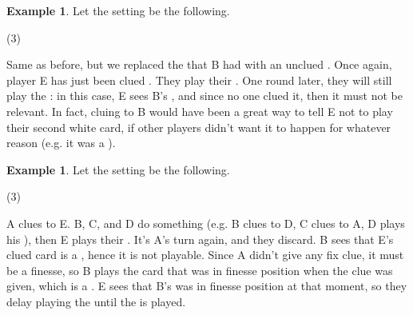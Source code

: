 \documentclass[a4paper]{article}
\theoremstyle{plain}
\theoremstyle{definition}
\newtheorem{example}[theorem]{Example}
\begin{document}
\begin{example}
	
	Let the setting be the following.
	
	\begin{tasks}(3)
		\task[+]      
		\task[A]    
		\task[B]    
		\task[C]    
		\task[D]    
		\task[E]    
	\end{tasks}
	
	Same as before, but we replaced the  that B had with an unclued . Once again, player E has just been clued . They play their . One round later, they will still play the : in this case, E sees B's , and since no one clued it, then it must not be relevant. In fact, cluing  to B would have been a great way to tell E not to play their second white card, if other players didn't want it to happen for whatever reason (e.g. it was a ).
	
\end{example}

\begin{example}
	
	Let the setting be the following.
	
	\begin{tasks}(3)
		\task[+]      
		\task[A]    
		\task[B]    
		\task[C]    
		\task[D]    
		\task[E]    
	\end{tasks}
	
	A clues  to E. B, C, and D do something (e.g. B clues  to D, C clues  to A, D plays his ), then E plays their . It's A's turn again, and they discard. B sees that E's clued card is a , hence it is not playable. Since A didn't give any fix clue, it must be a finesse, so B plays the card that was in finesse position when the  clue was given, which is a . E sees that B's  was in finesse position at that moment, so they delay playing the  until the  is played.
	
\end{example}
\end{document}
